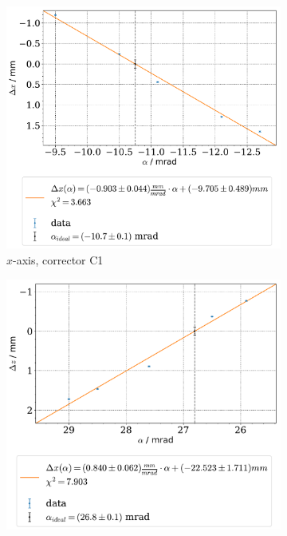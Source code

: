 \documentclass[11pt,a4paper,notitlepage]{scrartcl}
\begin{document}
\begin{figure}
	\vspace{-.5cm}
	\begin{subfigure}{.49\linewidth}
		\includegraphics[width=\linewidth]{figs/calibration/q2_x.pdf}
		\caption{$x$-axis, corrector C1}
	\end{subfigure}
	\begin{subfigure}{.49\linewidth}
		\includegraphics[width=\linewidth]{figs/calibration/q2_z.pdf}

\end{subfigure}
\end{figure}
\end{document}
